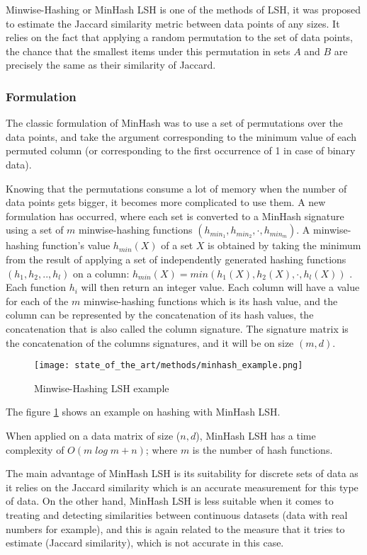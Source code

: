Minwise-Hashing or MinHash LSH is one of the methods of LSH, it was proposed to
estimate the Jaccard similarity metric  between data points of any sizes. It
relies on the fact that applying a random permutation to the set of data points,
the chance that the smallest items under this permutation in sets $A$ and $B$ are
precisely the same as their similarity of Jaccard. \citep{yu_yun_2022}

\subsubsection{Formulation}
The classic formulation of MinHash was to use a set of permutations over the
data points, and take the argument corresponding to the minimum value of each
permuted column (or corresponding to the first occurrence of 1 in case of binary
data).

Knowing that the permutations consume a lot of memory when the number of data
points gets bigger, it becomes more complicated to use them. A new formulation
has occurred, where each set is converted to a MinHash signature using a set of
$m$ minwise-hashing functions $(h_{min_1}, h_{min_2}, \cdot, h_{min_m})$. A
minwise-hashing function's value $h_{min}(X)$ of a set $X$ is obtained by taking
the minimum from the result of applying a set of independently generated hashing
functions $(h_1,h_2, .., h_l)$ on a column: $h_{min}(X) = min(h_1(X), h_2(X),
    \cdot, h_l(X))$ \citep{zhu_lshensemble_2016}. Each function $h_i$ will then
return an integer value. Each column will have a value for each of the $m$
minwise-hashing functions which is its hash value, and the column can be
represented by the concatenation of its hash values, the concatenation that is
also called the column signature. The signature matrix is the concatenation of
the columns signatures, and it will be on size $(m,d)$.

\begin{figure}[h]
    \centering
    \texttt{[image: state\_of\_the\_art/methods/minhash\_example.png]}
    \caption{Minwise-Hashing LSH example}
    \label{fig:minhashing_example}
\end{figure}

The figure \ref{fig:minhashing_example} shows an example on hashing with MinHash LSH.

When applied on a data matrix of size ($n, d$), MinHash LSH has a time
complexity of $O(m \; log\;m + n)$; where $m$ is the number of hash functions.
\citep{ertl_2020}

The main advantage of MinHash LSH is its suitability for discrete sets of data
as it relies on the Jaccard similarity which is an accurate measurement for this
type of data. On the other hand, MinHash LSH is less suitable when it comes to
treating and detecting similarities between continuous datasets (data with real
numbers for example), and this is again related to the measure that it tries to
estimate (Jaccard similarity), which is not accurate in this case.
